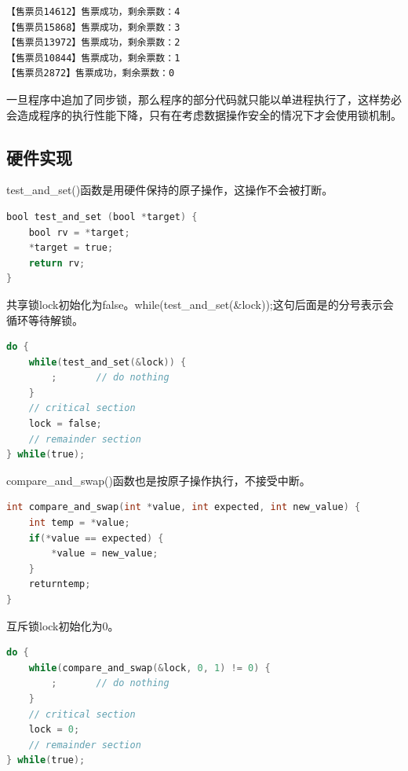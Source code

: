 \begin{tcolorbox}
    \begin{verbatim}
【售票员14612】售票成功，剩余票数：4
【售票员15868】售票成功，剩余票数：3
【售票员13972】售票成功，剩余票数：2
【售票员10844】售票成功，剩余票数：1
【售票员2872】售票成功，剩余票数：0
	\end{verbatim}
\end{tcolorbox}

一旦程序中追加了同步锁，那么程序的部分代码就只能以单进程执行了，这样势必会造成程序的执行性能下降，只有在考虑数据操作安全的情况下才会使用锁机制。\\

\subsection{硬件实现}

test\_and\_set()函数是用硬件保持的原子操作，这操作不会被打断。

\vspace{-0.5cm}

\begin{lstlisting}[language=C]
bool test_and_set (bool *target) {
	bool rv = *target;
	*target = true;
	return rv;
}
\end{lstlisting}

共享锁lock初始化为false。while(test\_and\_set(\&lock));这句后面是的分号表示会循环等待解锁。

\vspace{-0.5cm}

\begin{lstlisting}[language=C]
do {
	while(test_and_set(&lock)) {
		;		// do nothing
	}
	// critical section
	lock = false;
	// remainder section
} while(true);
\end{lstlisting}

compare\_and\_swap()函数也是按原子操作执行，不接受中断。

\vspace{-0.5cm}

\begin{lstlisting}[language=C]
int compare_and_swap(int *value, int expected, int new_value) {
	int temp = *value;
	if(*value == expected) {
		*value = new_value;
	}
	returntemp;
}
\end{lstlisting}

互斥锁lock初始化为0。

\vspace{-0.5cm}

\begin{lstlisting}[language=C]
do {
	while(compare_and_swap(&lock, 0, 1) != 0) {
		;		// do nothing
	}
	// critical section
	lock = 0;
	// remainder section
} while(true);
\end{lstlisting}

